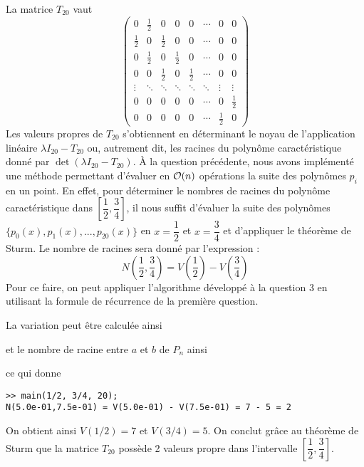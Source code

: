 La matrice $T_{20}$ vaut
\[
  \begin{pmatrix}
    0 & \frac 12 & 0 & 0 & 0 & \cdots & 0 & 0\\
    \frac 12 & 0 & \frac 12 & 0 & 0 & \cdots & 0 & 0\\
    0 & \frac 12 & 0 & \frac 12 & 0 & \cdots & 0 & 0\\
    0 & 0 & \frac 12 & 0 & \frac 12 & \cdots & 0 & 0\\
    \vdots & \ddots& \ddots& \ddots& \ddots& \ddots & \vdots & \vdots\\
    0 & 0 & 0 & 0 & 0 & \cdots & 0 & \frac 12\\
    0 & 0 & 0 & 0 & 0 & \cdots & \frac 12 & 0
  \end{pmatrix}
\]
Les valeurs propres de $T_{20}$ s'obtiennent en déterminant le noyau
de l'application linéaire $\lambda I_{20} - T_{20}$ ou,
autrement dit, les racines du polynôme caractéristique donné par
$\det(\lambda I_{20} - T_{20})$.
À la question précédente, nous avons implémenté une méthode permettant
d'évaluer en $\mathcal{O}(n)$ opérations la suite des polynômes $p_i$ en un point.
En effet, pour déterminer le nombres de racines du polynôme caractéristique
dans $\left[ \dfrac{1}{2} , \dfrac{3}{4} \right]$,
il nous suffit d'évaluer la suite des polynômes
$ \{ p_0(x), p_1(x), ... , p_{20}(x) \}$ en $x=\dfrac{1}{2}$
et $x=\dfrac{3}{4}$ et d'appliquer le théorème de Sturm.
Le nombre de racines sera donné par l'expression :
$$N(\dfrac{1}{2} , \dfrac{3}{4}) = V(\dfrac{1}{2}) - V(\dfrac{3}{4})$$
Pour ce faire, on peut appliquer l'algorithme développé à la question 3
en utilisant la formule de récurrence de la première question.

La variation peut être calculée ainsi

et le nombre de racine entre $a$ et $b$ de $P_n$ ainsi

ce qui donne
\begin{lstlisting}
>> main(1/2, 3/4, 20);
N(5.0e-01,7.5e-01) = V(5.0e-01) - V(7.5e-01) = 7 - 5 = 2
\end{lstlisting}

On obtient ainsi $V(1/2) = 7$ et $V(3/4) = 5$.
On conclut grâce au théorème de Sturm que la matrice $T_{20}$
possède 2 valeurs propre dans l'intervalle
$\left[ \dfrac{1}{2} , \dfrac{3}{4} \right]$.
